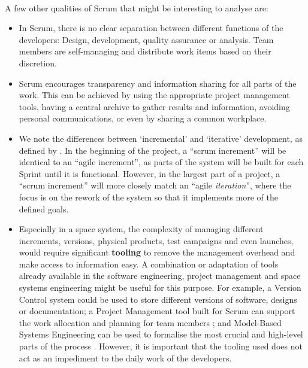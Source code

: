 \documentclass[]{iac}
\def\todo#1{}
\begin{document}
\paragraph{}
A few other qualities of Scrum that might be interesting to analyse are:
\begin{itemize}
    \item In Scrum, there is no clear separation between different functions of the developers: Design, development, quality assurance or analysis. Team members are self-managing and distribute work items based on their discretion.
    \item Scrum encourages transparency and information sharing for all parts of the work. This can be achieved by using the appropriate project management tools, having a central archive to gather results and information, avoiding personal communications, or even by sharing a common workplace.
    \item We note the differences between `incremental' and `iterative' development, as defined by \citeauthor{HEEAGER201822} \autocite{HEEAGER201822}. In the beginning of the project, a ``scrum increment'' will be identical to an ``agile increment'', as parts of the system will be built for each Sprint until it is functional. However, in the largest part of a project, a ``scrum increment'' will more closely match an ``agile \emph{iteration}'', where the focus is on the rework of the system so that it implements more of the defined goals.
    \item Especially in a space system, the complexity of managing different increments, versions, physical products, test campaigns and even launches, would require significant \textbf{tooling} to remove the management overhead and make access to information easy. A combination or adaptation of tools already available in the software engineering, project management and space systems engineering might be useful for this purpose. For example, a Version Control system could be used to store different versions of software, designs or documentation; a Project Management tool built for Scrum can support the work allocation and planning for team members \autocite{ciancarini_open_2020}; and Model-Based Systems Engineering can be used to formalise the most crucial and high-level parts of the process \autocite{boggero_mbse_2021,douglass_agile_2015}. However, it is important that the tooling used does not act as an impediment to the daily work of the developers.
\end{itemize}

\end{document}
